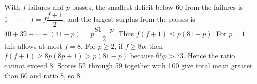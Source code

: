 With $f$ failures and $p$ passes, the smallest deficit below 60 from the failures is $1+\cdots+f=f\dfrac{f+1}{2}$, and the largest surplus from the passes is $40+39+\cdots+(41-p)=p\dfrac{81-p}{2}$. Thus $f(f+1)\le p(81-p)$. For $p=1$ this allows at most $f=8$. For $p\ge2$, if $f\ge8p$, then $f(f+1)\ge8p(8p+1)>p(81-p)$ because $65p>73$. Hence the ratio cannot exceed 8. Scores 52 through 59 together with 100 give total mean greater than 60 and ratio 8, so $\boxed8$.
